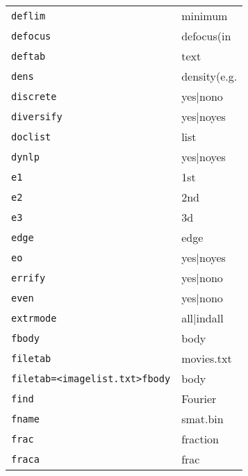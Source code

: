 \documentclass[review]{elsarticle}
\begin{document}
\begin{tabular}{ll}
\texttt{deflim}&{minimum}\\
\texttt{defocus}&{defocus(in}\\
\texttt{deftab}&{text}\\
\texttt{dens}&{density(e.g.}\\
\texttt{discrete}&{yes|no{no}}\\
\texttt{diversify}&{yes|no{yes}}\\
\texttt{doclist}&{list}\\
\texttt{dynlp}&{yes|no{yes}}\\
\texttt{e1}&{1st}\\
\texttt{e2}&{2nd}\\
\texttt{e3}&{3d}\\
\texttt{edge}&{edge}\\
\texttt{eo}&{yes|no{yes}}\\
\texttt{errify}&{yes|no{no}}\\
\texttt{even}&{yes|no{no}}\\
\texttt{extrmode}&{all|ind{all}}\\
\texttt{fbody}&{body}\\
\texttt{filetab}&{movies.txt}\\
\texttt{filetab=<imagelist.txt>fbody}&{body}\\
\texttt{find}&{Fourier}\\
\texttt{fname}&{smat.bin}\\
\texttt{frac}&{fraction}\\
\texttt{fraca}&{frac}\\
\end{tabular}
\end{document}
